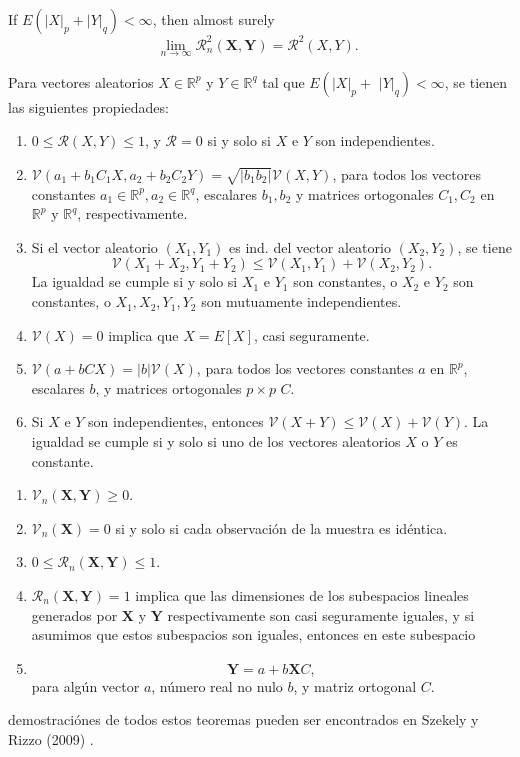 	\begin{cor}
		If $E\left(|X|_p+|Y|_q\right)<\infty$, then almost surely
		$$
		\lim _{n \rightarrow \infty} \mathcal{R}_n^2(\mathbf{X}, \mathbf{Y})=\mathcal{R}^2(X, Y) \text {. }
		$$
	\end{cor}
	\begin{thm}\label{thm3_brcov}
		Para vectores aleatorios $X \in \mathbb{R}^p$ y $Y \in \mathbb{R}^q$ tal que $E\left(|X|_p+\right.$ $\left.|Y|_q\right)<\infty$, se tienen las siguientes propiedades:
		\begin{enumerate}
			\item $0 \leq \mathcal{R}(X, Y) \leq 1$, y $\mathcal{R}=0$ si y solo si $X$ e $Y$ son independientes.
			\item $\mathcal{V}\left(a_1+b_1 C_1 X, a_2+b_2 C_2 Y\right)=\sqrt{\left|b_1 b_2\right|} \mathcal{V}(X, Y)$, para todos los vectores constantes $a_1 \in \mathbb{R}^p, a_2 \in \mathbb{R}^q$, escalares $b_1, b_2$ y matrices ortogonales $C_1, C_2$ en $\mathbb{R}^p$ y $\mathbb{R}^q$, respectivamente.	
			\item Si el vector aleatorio $\left(X_1, Y_1\right)$ es ind. del vector aleatorio $\left(X_2, Y_2\right)$, se tiene
			 $$
			\mathcal{V}\left(X_1+X_2, Y_1+Y_2\right) \leq \mathcal{V}\left(X_1, Y_1\right)+\mathcal{V}\left(X_2, Y_2\right) .
			$$
			La igualdad se cumple si y solo si $X_1$ e $Y_1$ son constantes, o $X_2$ e $Y_2$ son constantes, o $X_1, X_2, Y_1, Y_2$ son mutuamente independientes.

			\item $\mathcal{V}(X)=0$ implica que $X=E[X]$, casi seguramente.
			\item $\mathcal{V}(a+b C X)=|b| \mathcal{V}(X)$, para todos los vectores constantes $a$ en $\mathbb{R}^p$, escalares $b$, y matrices ortogonales $p \times p$ $C$.
			\item Si $X$ e $Y$ son independientes, entonces $\mathcal{V}(X+Y) \leq \mathcal{V}(X)+\mathcal{V}(Y)$. La igualdad se cumple si y solo si uno de los vectores aleatorios $X$ o $Y$ es constante.
		\end{enumerate}
	\end{thm}
	\begin{thm}
	\begin{enumerate}
		\item $\mathcal{V}_n(\mathbf{X}, \mathbf{Y}) \geq 0$.
		\item $\mathcal{V}_n(\mathbf{X})=0$ si y solo si cada observaci\'on de la muestra es id\'entica.
		\item $0 \leq \mathcal{R}_n(\mathbf{X}, \mathbf{Y}) \leq 1$.
		\item $\mathcal{R}_n(\mathbf{X}, \mathbf{Y})=1$ implica que las dimensiones de los subespacios lineales generados por $\mathbf{X}$ y $\mathbf{Y}$ respectivamente son casi seguramente iguales, y si asumimos que estos subespacios son iguales, entonces en este subespacio
		\item $$
		\mathbf{Y}=a+b \mathbf{X} C,
		$$
		para alg\'un vector $a$, n\'umero real no nulo $b$, y matriz ortogonal $C$.
	\end{enumerate}	
	\end{thm}
	demostraci\'ones de todos estos teoremas pueden ser encontrados en Szekely y Rizzo (2009) \cite{Szekely2009}.


